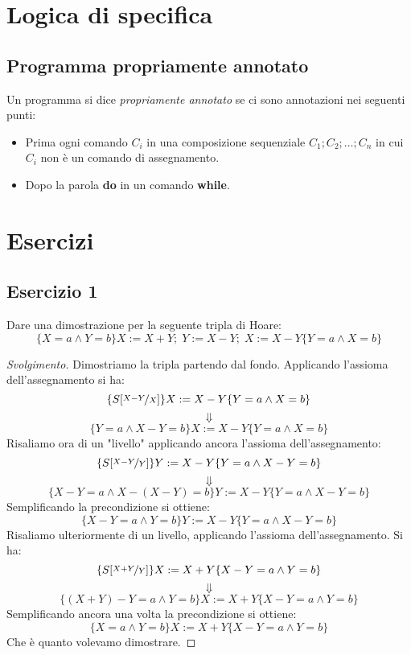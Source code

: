 \section{Logica di specifica}


\subsection{Programma propriamente annotato}
\begin{definizione}
Un programma si dice \emph{propriamente annotato} se ci sono annotazioni nei seguenti punti:
\begin{itemize}
        \item Prima ogni comando $C_i$ in una composizione sequenziale $C_1;C_2; \dots ;C_n$ in cui $C_i$ non è un comando di assegnamento.
        \item Dopo la parola \textbf{do} in un comando \textbf{while}.
\end{itemize}
\end{definizione}


\section{Esercizi}

\subsection{Esercizio 1}
Dare una dimostrazione per la seguente tripla di Hoare:
\[ \{X=a  \land Y=b\}  X:=X+Y; \; Y:=X-Y; \; X:=X-Y  \{Y=a  \land  X=b\} \]

\begin{proof}[Svolgimento]
Dimostriamo la tripla partendo dal fondo. Applicando l'assioma dell'assegnamento si ha:
\[ \{S[\nicefrac{X-Y}{X}] \}  X:=X-Y  \{Y=a  \land  X=b\} \]
\[ \Downarrow \]
\[ \{Y=a  \land X-Y=b \}  X:=X-Y  \{Y=a  \land  X=b\} \]
Risaliamo ora di un "livello" applicando ancora l'assioma dell'assegnamento:
\[ \{S[\nicefrac{X-Y}{Y}] \}  Y:=X-Y  \{Y=a  \land  X-Y=b\} \]
\[ \Downarrow \]
\[ \{X-Y=a  \land X-(X-Y)=b \}  Y:=X-Y  \{Y=a  \land  X-Y=b\} \]
Semplificando la precondizione si ottiene:
\[ \{X-Y=a  \land Y=b \}  Y:=X-Y  \{Y=a  \land  X-Y=b\} \]
Risaliamo ulteriormente di un livello, applicando l'assioma dell'assegnamento. Si ha:
\[ \{S[\nicefrac{X+Y}{Y}] \}  X:=X+Y  \{X-Y=a  \land  Y=b\} \]
\[ \Downarrow \]
\[ \{(X+Y)-Y=a  \land Y=b \}  X:=X+Y  \{X-Y=a  \land  Y=b\} \]
Semplificando ancora una volta la precondizione si ottiene:
\[ \{X=a  \land Y=b \}  X:=X+Y  \{X-Y=a  \land  Y=b\} \]
Che è quanto volevamo dimostrare.
\end{proof}

